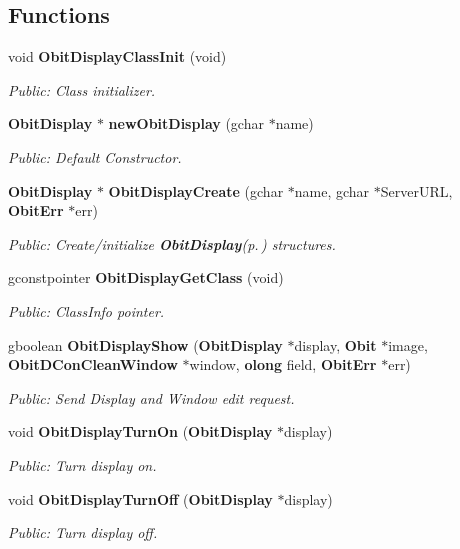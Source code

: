\subsection*{Functions}
\begin{CompactItemize}
\item 
void {\bf Obit\-Display\-Class\-Init} (void)
\begin{CompactList}\small\item\em Public: Class initializer. \item\end{CompactList}\item 
{\bf Obit\-Display} $\ast$ {\bf new\-Obit\-Display} (gchar $\ast$name)
\begin{CompactList}\small\item\em Public: Default Constructor. \item\end{CompactList}\item 
{\bf Obit\-Display} $\ast$ {\bf Obit\-Display\-Create} (gchar $\ast$name, gchar $\ast$Server\-URL, {\bf Obit\-Err} $\ast$err)
\begin{CompactList}\small\item\em Public: Create/initialize {\bf Obit\-Display}{\rm (p.\,\pageref{structObitDisplay})} structures. \item\end{CompactList}\item 
gconstpointer {\bf Obit\-Display\-Get\-Class} (void)
\begin{CompactList}\small\item\em Public: Class\-Info pointer. \item\end{CompactList}\item 
gboolean {\bf Obit\-Display\-Show} ({\bf Obit\-Display} $\ast$display, {\bf Obit} $\ast$image, {\bf Obit\-DCon\-Clean\-Window} $\ast$window, {\bf olong} field, {\bf Obit\-Err} $\ast$err)
\begin{CompactList}\small\item\em Public: Send Display and Window edit request. \item\end{CompactList}\item 
void {\bf Obit\-Display\-Turn\-On} ({\bf Obit\-Display} $\ast$display)
\begin{CompactList}\small\item\em Public: Turn display on. \item\end{CompactList}\item 
void {\bf Obit\-Display\-Turn\-Off} ({\bf Obit\-Display} $\ast$display)
\begin{CompactList}\small\item\em Public: Turn display off. \item\end{CompactList}\end{CompactItemize}


